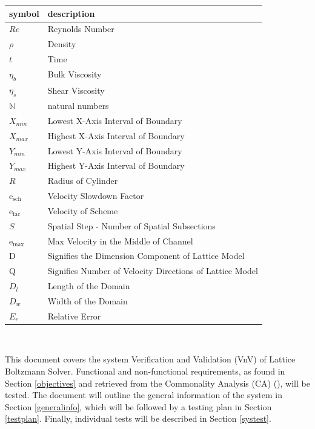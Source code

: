 \documentclass[12pt, titlepage]{article}
\newcommand{\myprogname}{Lattice Boltzmann Solver}
\begin{document}
\renewcommand{\arraystretch}{1.2}
\begin{tabular}{l l} 
  \toprule		
  \textbf{symbol} & \textbf{description}\\
  \midrule 
  $Re$ & Reynolds Number\\
  $\rho$ & Density \\
  $t$ & Time \\
  $\eta_b$ & Bulk Viscosity \\
  $\eta_s$ & Shear Viscosity \\
  $\mathbb{N}$ & natural numbers\\
  $X_{min}$ & Lowest X-Axis Interval of Boundary\\
  $X_{max}$ & Highest X-Axis Interval of Boundary\\
  $Y_{min}$ & Lowest Y-Axis Interval of Boundary\\
  $Y_{max}$ & Highest Y-Axis Interval of Boundary\\
  $R$ & Radius of Cylinder\\
  $\mathrm{e_{sch}}$ & Velocity Slowdown Factor\\
  $\mathrm{e_{fac}}$ & Velocity of Scheme\\
  $S$ & Spatial Step - Number of Spatial Subsections\\
  $\mathrm{e_{max}}$ & Max Velocity in the Middle of Channel\\
  $\mathrm{D}$ & Signifies the Dimension Component of Lattice Model\\
  $\mathrm{Q}$ & Signifies Number of Velocity Directions of Lattice Model\\
  $D_{l}$ & Length of the Domain\\
  $D_{w}$ & Width of the Domain\\
  $E_r$ & Relative Error\\
  \bottomrule
\end{tabular}\\

\newpage


\noindent This document covers the system Verification and Validation (VnV) of \myprogname . Functional and non-functional requirements, as found in Section \ref{objectives} and retrieved from the Commonality Analysis (CA) (\citet{LBM_CA_PM}), will be tested. The document will outline the general information of the system in Section \ref{generalinfo}, which will be followed by a testing plan in Section \ref{testplan}. Finally, individual tests will be described in Section \ref{systest}. 
\end{document}
